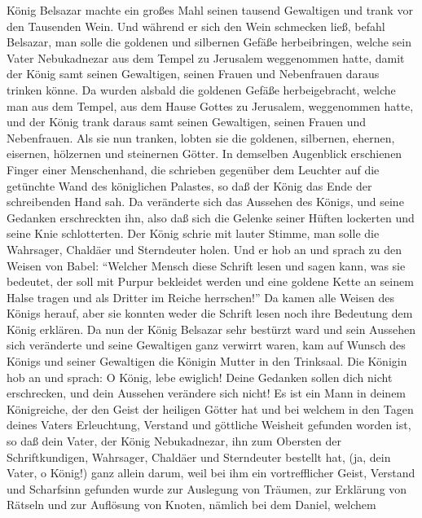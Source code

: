  König Belsazar machte ein großes Mahl seinen tausend
Gewaltigen und trank vor den Tausenden Wein.  Und während
er sich den Wein schmecken ließ, befahl Belsazar, man solle die goldenen
und silbernen Gefäße herbeibringen, welche sein Vater Nebukadnezar aus
dem Tempel zu Jerusalem weggenommen hatte, damit der König samt seinen
Gewaltigen, seinen Frauen und Nebenfrauen daraus trinken könne.
 Da wurden alsbald die goldenen Gefäße herbeigebracht,
welche man aus dem Tempel, aus dem Hause Gottes zu Jerusalem,
weggenommen hatte, und der König trank daraus samt seinen Gewaltigen,
seinen Frauen und Nebenfrauen.  Als sie nun tranken,
lobten sie die goldenen, silbernen, ehernen, eisernen, hölzernen und
steinernen Götter.  In demselben Augenblick erschienen
Finger einer Menschenhand, die schrieben gegenüber dem Leuchter auf die
getünchte Wand des königlichen Palastes, so daß der König das Ende der
schreibenden Hand sah.  Da veränderte sich das Aussehen
des Königs, und seine Gedanken erschreckten ihn, also daß sich die
Gelenke seiner Hüften lockerten und seine Knie schlotterten.
 Der König schrie mit lauter Stimme, man solle die
Wahrsager, Chaldäer und Sterndeuter holen. Und er hob an und sprach zu
den Weisen von Babel: ``Welcher Mensch diese Schrift lesen und sagen
kann, was sie bedeutet, der soll mit Purpur bekleidet werden und eine
goldene Kette an seinem Halse tragen und als Dritter im Reiche
herrschen!''  Da kamen alle Weisen des Königs herauf, aber
sie konnten weder die Schrift lesen noch ihre Bedeutung dem König
erklären.  Da nun der König Belsazar sehr bestürzt ward
und sein Aussehen sich veränderte und seine Gewaltigen ganz verwirrt
waren,  kam auf Wunsch des Königs und seiner Gewaltigen
die Königin Mutter in den Trinksaal. Die Königin hob an und sprach: O
König, lebe ewiglich! Deine Gedanken sollen dich nicht erschrecken, und
dein Aussehen verändere sich nicht!  Es ist ein Mann in
deinem Königreiche, der den Geist der heiligen Götter hat und bei
welchem in den Tagen deines Vaters Erleuchtung, Verstand und göttliche
Weisheit gefunden worden ist, so daß dein Vater, der König Nebukadnezar,
ihn zum Obersten der Schriftkundigen, Wahrsager, Chaldäer und
Sterndeuter bestellt hat, (ja, dein Vater, o König!) 
ganz allein darum, weil bei ihm ein vortrefflicher Geist, Verstand und
Scharfsinn gefunden wurde zur Auslegung von Träumen, zur Erklärung von
Rätseln und zur Auflösung von Knoten, nämlich bei dem Daniel, welchem
